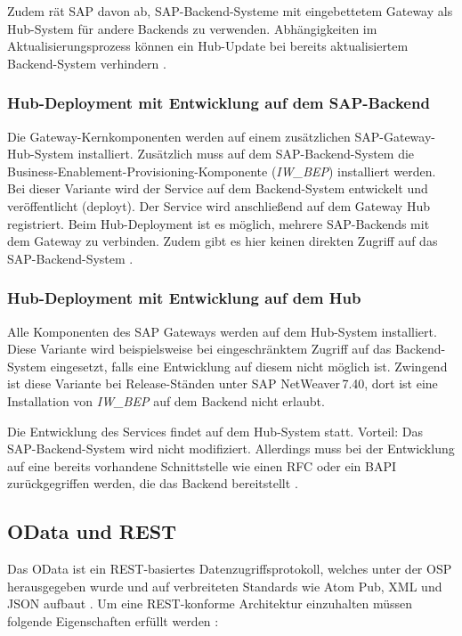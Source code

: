 Zudem rät SAP davon ab, SAP-Backend-Systeme mit eingebettetem Gateway als Hub-System für andere Backends zu verwenden. Abhängigkeiten im Aktualisierungsprozess können ein Hub-Update bei bereits aktualisiertem Backend-System verhindern \cite[S.\ 52-54]{BoennenDreesFischerHeinzStrothmann2014}.

\subsubsection{Hub-Deployment mit Entwicklung auf dem SAP-Backend}

Die Gateway-Kernkomponenten werden auf einem zusätzlichen SAP-Gate\-way-Hub-System installiert. Zusätzlich muss auf dem SAP-Backend-System die Business-Enablement-Provisioning-Komponente (\textit{IW\_BEP}) installiert werden. Bei dieser Variante wird der Service auf dem Backend-System entwickelt und veröffentlicht (deployt). Der Service wird anschließend auf dem Gateway Hub registriert. Beim Hub-Deployment ist es möglich, mehrere SAP-Backends mit dem Gateway zu verbinden. Zudem gibt es hier keinen direkten Zugriff auf das SAP-Backend-System \cite[S.\ 54]{BoennenDreesFischerHeinzStrothmann2014}.

\subsubsection{Hub-Deployment mit Entwicklung auf dem Hub}

Alle Komponenten des SAP Gateways werden auf dem Hub-System installiert. Diese Variante wird beispielsweise bei eingeschränktem Zugriff auf das Backend-System eingesetzt, falls eine Entwicklung auf diesem nicht möglich ist. Zwingend ist diese Variante bei Release-Ständen unter SAP NetWeaver\,7.40, dort ist eine Installation von \textit{IW\_BEP}  auf dem Backend nicht erlaubt. 

Die Entwicklung des Services findet auf dem Hub-System statt. Vorteil: Das SAP-Backend-System wird nicht modifiziert. Allerdings muss bei der Entwicklung auf eine bereits vorhandene Schnittstelle wie \zB einen \ac{RFC} oder ein \ac{BAPI} zurückgegriffen werden, die das Backend bereitstellt \cite[S.\ 55]{BoennenDreesFischerHeinzStrothmann2014}.


\subsection{OData und REST}
Das \ac{OData} ist ein REST-basiertes Datenzugriffsprotokoll, welches unter der \ac{OSP} herausgegeben wurde und auf verbreiteten Standards wie Atom Pub, XML und JSON aufbaut \cite[S.\ 69-70]{BoennenDreesFischerHeinzStrothmann2014}.
Um eine \ac{REST}-konforme Architektur einzuhalten müssen folgende Eigenschaften erfüllt werden \cite[S.\ 65-66]{BoennenDreesFischerHeinzStrothmann2014}:

